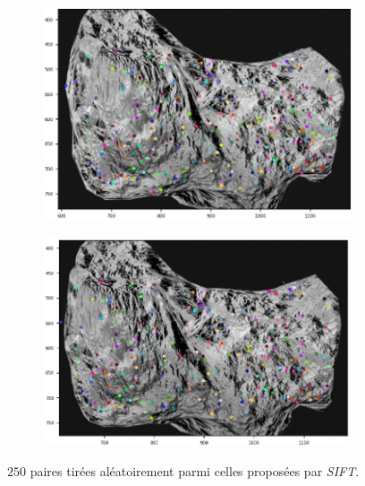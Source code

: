\documentclass[
	a4paper, %
	10pt, %
	unnumberedsections, %
	twoside, %
]{LTJournalArticle}
\begin{document}
\begin{figure}
	\centering
	\begin{subfigure}[H]{0.45\textwidth}
		\centering
		\includegraphics[width=\textwidth]{images/res1_sift_g.png}
	\end{subfigure}
	\hfill
	\begin{subfigure}[H]{0.45\textwidth}
		\centering
		\includegraphics[width=\textwidth]{images/res1_sift_d.png}
	\end{subfigure}
	\caption{$250$ paires tirées aléatoirement parmi celles proposées par \textit{SIFT}.}
	\label{figure:fig_syn_sift}
\end{figure}
\end{document}
